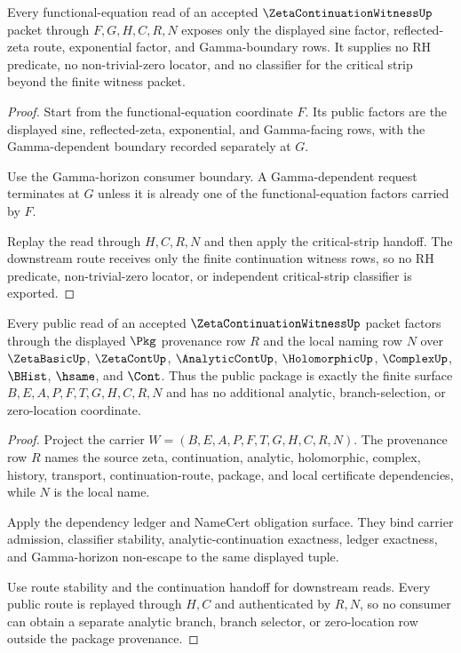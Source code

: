 \begin{theorem}
\label{thm:zeta-continuation-witness-functional-factor-nonescape}
Every functional-equation read of an accepted $\ZetaContinuationWitnessUp$ packet through $F,G,H,C,R,N$ exposes only the displayed sine factor, reflected-zeta route, exponential factor, and Gamma-boundary rows. It supplies no RH predicate, no non-trivial-zero locator, and no classifier for the critical strip beyond the finite witness packet.
\end{theorem}
\begin{proof}
Start from the functional-equation coordinate $F$. Its public factors are the displayed sine, reflected-zeta, exponential, and Gamma-facing rows, with the Gamma-dependent boundary recorded separately at $G$.

Use the Gamma-horizon consumer boundary. A Gamma-dependent request terminates at $G$ unless it is already one of the functional-equation factors carried by $F$.

Replay the read through $H,C,R,N$ and then apply the critical-strip handoff. The downstream route receives only the finite continuation witness rows, so no RH predicate, non-trivial-zero locator, or independent critical-strip classifier is exported.
\end{proof}

\begin{theorem}
\label{thm:zeta-continuation-witness-package-provenance-exactness}
Every public read of an accepted $\ZetaContinuationWitnessUp$ packet factors through the displayed $\Pkg$ provenance row $R$ and the local naming row $N$ over $\ZetaBasicUp$, $\ZetaContUp$, $\AnalyticContUp$, $\HolomorphicUp$, $\ComplexUp$, $\BHist$, $\hsame$, and $\Cont$. Thus the public package is exactly the finite surface $B,E,A,P,F,T,G,H,C,R,N$ and has no additional analytic, branch-selection, or zero-location coordinate.
\end{theorem}
\begin{proof}
Project the carrier $W=(B,E,A,P,F,T,G,H,C,R,N)$. The provenance row $R$ names the source zeta, continuation, analytic, holomorphic, complex, history, transport, continuation-route, package, and local certificate dependencies, while $N$ is the local name.

Apply the dependency ledger and NameCert obligation surface. They bind carrier admission, classifier stability, analytic-continuation exactness, ledger exactness, and Gamma-horizon non-escape to the same displayed tuple.

Use route stability and the continuation handoff for downstream reads. Every public route is replayed through $H,C$ and authenticated by $R,N$, so no consumer can obtain a separate analytic branch, branch selector, or zero-location row outside the package provenance.
\end{proof}

